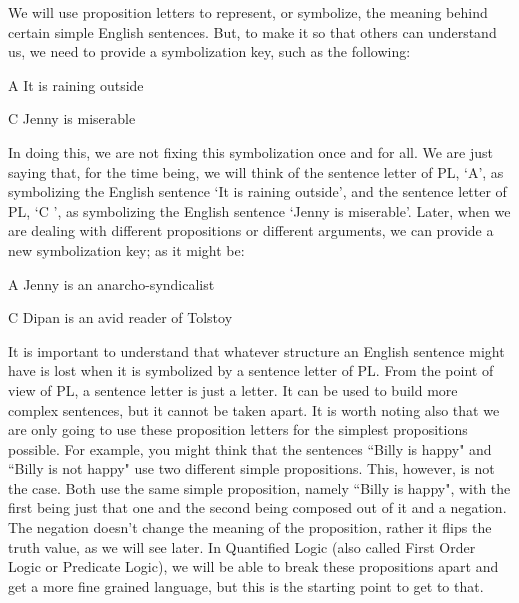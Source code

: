 We will use proposition letters to represent, or symbolize, the meaning behind certain simple English sentences. But, to make it so that others can understand us, we need to provide a \gls{symbolization key}, such as the following:
\begin{ekey}
\item[A] It is raining outside
\item[C] Jenny is miserable
\end{ekey}
In doing this, we are not fixing this symbolization once and for all. We are just saying that, for the time being, we will think of the sentence letter of PL, ‘A’, as symbolizing the English sentence ‘It is raining outside’, and the sentence letter of PL, ‘C ’, as symbolizing the English sentence ‘Jenny is miserable’. Later, when we are dealing with different propositions or different arguments, we can provide a new symbolization key; as it might be:
\begin{earg}
\item[A] Jenny is an anarcho-syndicalist
\item[C] Dipan is an avid reader of Tolstoy
\end{earg}
It is important to understand that whatever structure an English sentence might have is lost when it is symbolized by a sentence letter of PL. From the point of view of PL, a sentence letter is just a letter. It can be used to build more complex sentences, but it cannot be taken apart. It is worth noting also that we are only going to use these proposition letters for the simplest propositions possible. For example, you might think that the sentences “Billy is happy" and “Billy is not happy" use two different simple propositions. This, however, is not the case. Both use the same simple proposition, namely “Billy is happy", with the first being just that one and the second being composed out of it and a negation. The negation doesn't change the meaning of the proposition, rather it flips the truth value, as we will see later. In Quantified Logic (also called First Order Logic or Predicate Logic), we will be able to break these propositions apart and get a more fine grained language, but this is the starting point to get to that.

